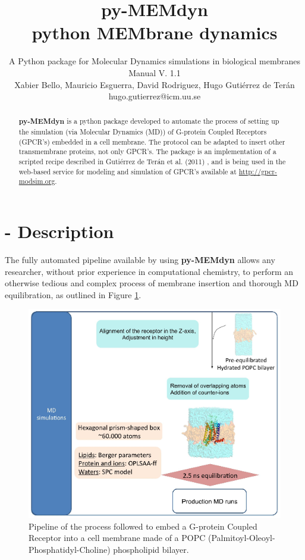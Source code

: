 \documentclass[10pt, oneside, pdftex]{article}
\title{py-MEMdyn \\ 
\large \vspace*{-10pt}python MEMbrane dynamics\vspace*{10pt}}
\author{%
A Python package for Molecular Dynamics simulations in biological membranes\\
Manual V. 1.1 \\
Xabier Bello, Mauricio Esguerra, David Rodriguez, Hugo Guti\'{e}rrez de Ter\'{a}n \\
hugo.gutierrez@icm.uu.se \\
\vspace{20pt}
}
\makeatletter
\def\printtitle{%
{\color{bl} \centering \huge  \textbf{\@title}\par}}    %
\def\printauthor{%
{\centering \small \@author}}                           %
\makeatother
\begin{document}
\printtitle 
\printauthor

\begin{abstract}
\noindent \textbf{py-MEMdyn} is a python package developed to automate
the process of setting up the simulation (via Molecular Dynamics (MD))
of G-protein  Coupled Receptors (GPCR's) embedded in  a cell membrane.
The protocol  can be adapted  to insert other  transmembrane proteins,
not  only GPCR's.   The package  is  an implementation  of a  scripted
recipe  described  in  Guti\'{e}rrez   de  Ter\'{a}n  et  al.   (2011)
\cite{rodriguez2011}, and  is being used in the  web-based service for
modeling     and     simulation     of     GPCR's     available     at
\url{http://gpcr-modsim.org}.
\end{abstract}

\section*{ - Description}
The  fully automated  pipeline available  by  using \textbf{py-MEMdyn}
allows  any  researcher,  without  prior experience  in  computational
chemistry,  to perform  an otherwise  tedious and  complex  process of
membrane  insertion  and thorough  MD  equilibration,  as outlined  in
Figure \ref{fig:pipeline}.

\begin{figure}[htbp]
\centering
\includegraphics[scale=0.6]{pipeline.png}
\caption{Pipeline of the process followed to embed a G-protein Coupled
  Receptor    into    a   cell    membrane    made    of   a   POPC
  (Palmitoyl-Oleoyl-Phosphatidyl-Choline) phospholipid bilayer.}
\label{fig:pipeline}
\end{figure} 
\end{document}
